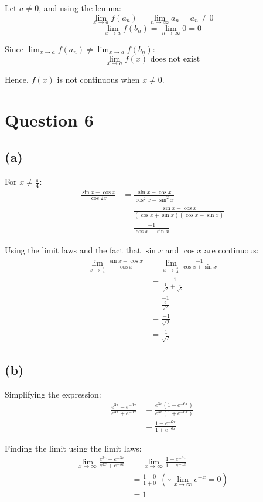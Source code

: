 \documentclass[11pt]{article}
\begin{document}
Let \(a \neq 0\), and using the lemma:
\[\lim_{x \rightarrow a} f(a_n) = \lim_{n \rightarrow \infty} a_n = a_n \neq 0\]
\[\lim_{x \rightarrow a} f(b_n) = \lim_{n \rightarrow \infty} 0 = 0\]

Since \(\lim_{x \rightarrow a} f(a_n) \neq \lim_{x \rightarrow a} f(b_n)\):
\[\lim_{x \rightarrow a} f(x) \text{ does not exist}\]

Hence, \(f(x)\) is not continuous when \(x \neq 0\).

\section{Question 6}
\label{sec:org2e2d616}

\subsection{(a)}
\label{sec:orga72e220}
For \(x \neq \frac{\pi}{4}\):
\begin{align*}
\frac{\sin x - \cos x}{\cos 2x} &= \frac{\sin x - \cos x}{\cos^2 x - \sin^2 x} \\
&= \frac{\sin x - \cos x}{(\cos x + \sin x)(\cos x - \sin x)} \\
&= \frac{-1}{\cos x + \sin x}
\end{align*}

Using the limit laws and the fact that \(\sin x\) and \(\cos x\) are continuous:
\begin{align*}
\lim_{x \rightarrow \frac{\pi}{4}} \frac{\sin x - \cos x}{\cos x} &= \lim_{x \rightarrow \frac{\pi}{4}} \frac{-1}{\cos x + \sin x} \\
&= \frac{-1}{\frac{1}{\sqrt{2}} + \frac{1}{\sqrt{2}}} \\
&= \frac{-1}{\frac{2}{\sqrt{2}}} \\
&= \frac{-1}{\sqrt{2}} \\
&= \frac{1}{\sqrt{2}}
\end{align*}

\subsection{(b)}
\label{sec:orgab99d37}
Simplifying the expression:
\begin{align*}
\frac{e^{3x} - e^{-3x}}{e^{3x} + e^{-3x}} &= \frac{e^{3x}(1 - e^{-6x})}{e^{3x}(1 + e^{-6x})} \\
&= \frac{1 - e^{-6x}}{1 + e^{-6x}}
\end{align*}

Finding the limit using the limit laws:
\begin{align*}
\lim_{x \rightarrow \infty} \frac{e^{3x} - e^{-3x}}{e^{3x} + e^{-3x}} &= \lim_{x \rightarrow \infty} \frac{1 - e^{-6x}}{1 + e^{-6x}} \\
&= \frac{1 - 0}{1 + 0} \ \ (\because \lim_{x \rightarrow \infty} e^{-x} = 0) \\
&= 1
\end{align*}
\end{document}
